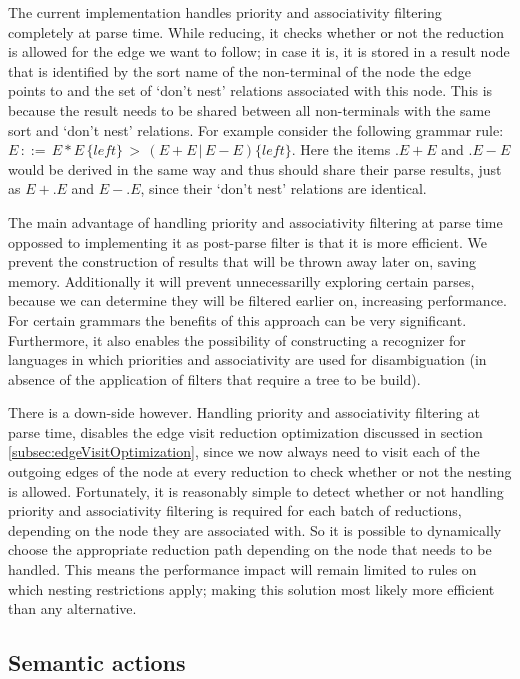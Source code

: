 \documentclass[a4paper,10pt]{article}
\begin{document}
The current implementation handles priority and associativity filtering completely at parse time. While reducing, it checks whether or not the reduction is allowed for the edge we want to follow; in case it is, it is stored in a result node that is identified by the sort name of the non-terminal of the node the edge points to and the set of `don't nest' relations associated with this node. This is because the result needs to be shared between all non-terminals with the same sort and `don't nest' relations. For example consider the following grammar rule: $E\,::=\,E * E\,\{left\}\,>\,(E + E\,|\,E - E)\{left\}$. Here the items $.E + E$ and $.E - E$ would be derived in the same way and thus should share their parse results, just as $E+.E$ and $E-.E$, since their `don't nest' relations are identical.

The main advantage of handling priority and associativity filtering at parse time oppossed to implementing it as post-parse filter is that it is more efficient. We prevent the construction of results that will be thrown away later on, saving memory. Additionally it will prevent unnecessarilly exploring certain parses, because we can determine they will be filtered earlier on, increasing performance. For certain grammars the benefits of this approach can be very significant. Furthermore, it also enables the possibility of constructing a recognizer for languages in which priorities and associativity are used for disambiguation (in absence of the application of filters that require a tree to be build).

There is a down-side however. Handling priority and associativity filtering at parse time, disables the edge visit reduction optimization discussed in section \ref{subsec:edgeVisitOptimization}, since we now always need to visit each of the outgoing edges of the node at every reduction to check whether or not the nesting is allowed. Fortunately, it is reasonably simple to detect whether or not handling priority and associativity filtering is required for each batch of reductions, depending on the node they are associated with. So it is possible to dynamically choose the appropriate reduction path depending on the node that needs to be handled. This means the performance impact will remain limited to rules on which nesting restrictions apply; making this solution most likely more efficient than any alternative.

\subsection{Semantic actions}
\end{document}
